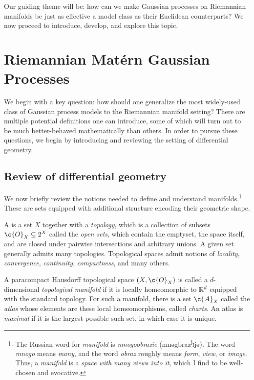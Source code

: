 \documentclass[11pt]{book}
\begin{document}
Our guiding theme will be: how can we make Gaussian processes on Riemannian manifolds be just as effective a model class as their Euclidean counterparts?
We now proceed to introduce, develop, and explore this topic.


\section{Riemannian Matérn Gaussian Processes}

We begin with a key question: how should one generalize the most widely-used class of Gaussian process models to the Riemannian manifold setting?
There are multiple potential definitions one can introduce, some of which will turn out to be much better-behaved mathematically than others.
In order to pursue these questions, we begin by introducing and reviewing the setting of differential geometry.

\subsection{Review of differential geometry}
We now briefly review the notions needed to define and understand manifolds.\footnote{The Russian word for \emph{manifold} is \emph{mnogoobrazie} (mnəgbr{\textquotesingle}az\textsuperscript{j}\textsc{i}jə). The word \emph{mnogo} means \emph{many}, and the word \emph{obraz} roughly means \emph{form}, \emph{view}, or \emph{image}. 
Thus, a \emph{manifold} is a \emph{space with many views into it}, which I find to be well-chosen and evocative.}
These are sets equipped with additional structure encoding their geometric shape.

A  is a set $X$ together with a \emph{topology}, which is a collection of subsets $\c{O}_X \subseteq 2^X$ called the \emph{open sets}, which contain the emptyset, the space itself, and are closed under pairwise intersections and arbitrary unions.
A given set generally admits many topologies.
Topological spaces admit notions of \emph{locality}, \emph{convergence}, \emph{continuity}, \emph{compactness}, and many others.

A paracompact Hausdorff topological space $(X,\c{O}_X)$ is called a $d$-dimensional \emph{topological manifold} if it is locally homeomorphic to $\mathbb{R}^d$ equipped with the standard topology.
For such a manifold, there is a set $\c{A}_X$ called the \emph{atlas} whose elements are these local homeomorphisms, called \emph{charts}.
An atlas is \emph{maximal} if it is the largest possible such set, in which case it is unique.
\end{document}
